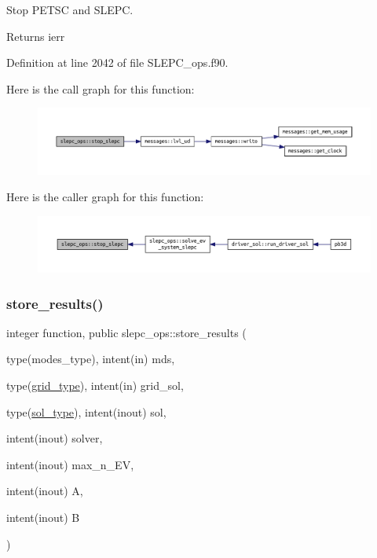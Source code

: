 Stop P\+E\+T\+SC and S\+L\+E\+PC. 

\begin{DoxyReturn}{Returns}
ierr 
\end{DoxyReturn}


Definition at line 2042 of file S\+L\+E\+P\+C\+\_\+ops.\+f90.

Here is the call graph for this function\+:\nopagebreak
\begin{figure}[H]
\begin{center}
\leavevmode
\includegraphics[width=350pt]{namespaceslepc__ops_aeeac6908b3988f395314e7769829a058_cgraph}
\end{center}
\end{figure}
Here is the caller graph for this function\+:\nopagebreak
\begin{figure}[H]
\begin{center}
\leavevmode
\includegraphics[width=350pt]{namespaceslepc__ops_aeeac6908b3988f395314e7769829a058_icgraph}
\end{center}
\end{figure}
\mbox{\label{namespaceslepc__ops_a24d97496000ed55f1d11e4d436e084a6}} 
\subsubsection{\texorpdfstring{store\+\_\+results()}{store\_results()}}
{\footnotesize\ttfamily integer function, public slepc\+\_\+ops\+::store\+\_\+results (\begin{DoxyParamCaption}\item[{type(modes\+\_\+type), intent(in)}]{mds,  }\item[{type(\hyperlink{structgrid__vars_1_1grid__type}{grid\+\_\+type}), intent(in)}]{grid\+\_\+sol,  }\item[{type(\hyperlink{structsol__vars_1_1sol__type}{sol\+\_\+type}), intent(inout)}]{sol,  }\item[{intent(inout)}]{solver,  }\item[{intent(inout)}]{max\+\_\+n\+\_\+\+EV,  }\item[{intent(inout)}]{A,  }\item[{intent(inout)}]{B }\end{DoxyParamCaption})}



